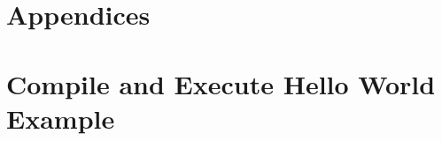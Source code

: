 \documentclass{article}
\begin{document}
\begin{enumerate}
\begin{verbatim}
\end{verbatim}
\normalsize
\end{enumerate}








\appendix
{}
\section*{Appendices}
\section{Compile and Execute Hello World Example}
\end{document}
